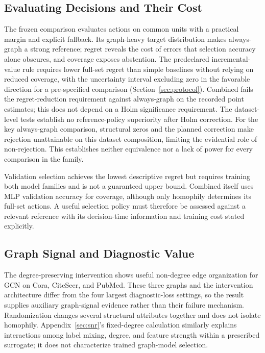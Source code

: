 \subsection{Evaluating Decisions and Their Cost}

The frozen comparison evaluates actions on common units with a practical margin and explicit fallback. Its graph-heavy target distribution makes always-graph a strong reference; regret reveals the cost of errors that selection accuracy alone obscures, and coverage exposes abstention. The predeclared incremental-value rule requires lower full-set regret than simple baselines without relying on reduced coverage, with the uncertainty interval excluding zero in the favorable direction for a pre-specified comparison (Section~\ref{sec:protocol}). Combined fails the regret-reduction requirement against always-graph on the recorded point estimates; this does not depend on a Holm significance requirement. The dataset-level tests establish no reference-policy superiority after Holm correction. For the key always-graph comparison, structural zeros and the planned correction make rejection unattainable on this dataset composition, limiting the evidential role of non-rejection. This establishes neither equivalence nor a lack of power for every comparison in the family.

Validation selection achieves the lowest descriptive regret but requires training both model families and is not a guaranteed upper bound. Combined itself uses MLP validation accuracy for coverage, although only homophily determines its full-set actions. A useful selection policy must therefore be assessed against a relevant reference with its decision-time information and training cost stated explicitly.

\subsection{Graph Signal and Diagnostic Value}

The degree-preserving intervention shows useful non-degree edge organization for GCN on Cora, CiteSeer, and PubMed. These three graphs and the intervention architecture differ from the four largest diagnostic-loss settings, so the result supplies auxiliary graph-signal evidence rather than their failure mechanism. Randomization changes several structural attributes together and does not isolate homophily. Appendix~\ref{sec:snr}'s fixed-degree calculation similarly explains interactions among label mixing, degree, and feature strength within a prescribed surrogate; it does not characterize trained graph-model selection.

